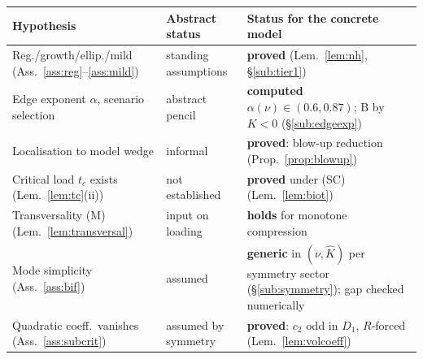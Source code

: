 \begin{table}[t]
    \centering
    \begin{tabular}{lll}
        \toprule
        Hypothesis                                                                & Abstract status                                                & Status for the concrete model                                                                                   \\
        \midrule
        Reg./growth/ellip./mild (Ass.~\ref{ass:reg}--\ref{ass:mild})              & standing assumptions                                           & \textbf{proved} (Lem.~\ref{lem:nh}, \S\ref{sub:tier1})                                                          \\
        Edge exponent $\alpha$, scenario selection                                & abstract pencil                                                & \textbf{computed} $\alpha(\nu){\in}(0.6,0.87)$; B by $K{<}0$ (\S\ref{sub:edgeexp})                              \\
        Localisation to model wedge                                               & informal                                                       & \textbf{proved}: blow-up reduction (Prop.~\ref{prop:blowup})                                                    \\
        Critical load $t_c$ exists (Lem.~\ref{lem:tc}(ii))                        & not established                                                & \textbf{proved} under (SC) (Lem.~\ref{lem:biot})                                                                \\
        Transversality (M) (Lem.~\ref{lem:transversal})                           & input on loading                                               & \textbf{holds} for monotone compression                                                                         \\
        Mode simplicity (Ass.~\ref{ass:bif})                                      & assumed                                                        & \textbf{generic} in $(\nu,\hat K)$ per symmetry sector (\S\ref{sub:symmetry}); gap checked numerically          \\
        Quadratic coeff.\ vanishes (Ass.~\ref{ass:subcrit})                       & assumed by symmetry                                            & \textbf{proved}: $c_2$ odd in $D_1$, $R$-forced (Lem.~\ref{lem:volcoeff})                                       \\

\end{tabular}
\end{table}
